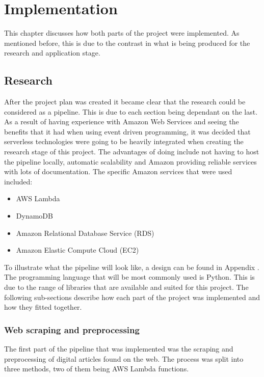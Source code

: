 \documentclass[a4paper,11pt]{report}
\begin{document}
\chapter{Implementation}
\label{chap:implementation}
This chapter discusses how both parts of the project were implemented. As mentioned before, this is due to the contrast in what is being produced for the research and application stage.

\section{Research}
After the project plan was created it became clear that the research could be considered as a pipeline. This is due to each section being dependant on the last.  As a result of having experience with Amazon Web Services and seeing the benefits that it had when using event driven programming, it was decided that serverless technologies were going to be heavily integrated when creating the research stage of this project. The advantages of doing include not having to host the pipeline locally, automatic scalability and Amazon providing reliable services with lots of documentation. The specific Amazon services that were used included:

\begin{itemize}
 	\item {AWS Lambda}
	\item {DynamoDB}
	\item {Amazon Relational Database Service (RDS)}
 	\item {Amazon Elastic Compute Cloud (EC2)}
\end{itemize}

To illustrate what the pipeline will look like, a design can be found in Appendix . The programming language that will be most commonly used is Python. This is due to the range of libraries that are available and suited for this project. The following sub-sections describe how each part of the project was implemented and how they fitted together.

\subsection{Web scraping and preprocessing}
The first part of the pipeline that was implemented was the scraping and preprocessing of digital articles found on the web. The process was split into three methods, two of them being AWS Lambda functions.
\end{document}
